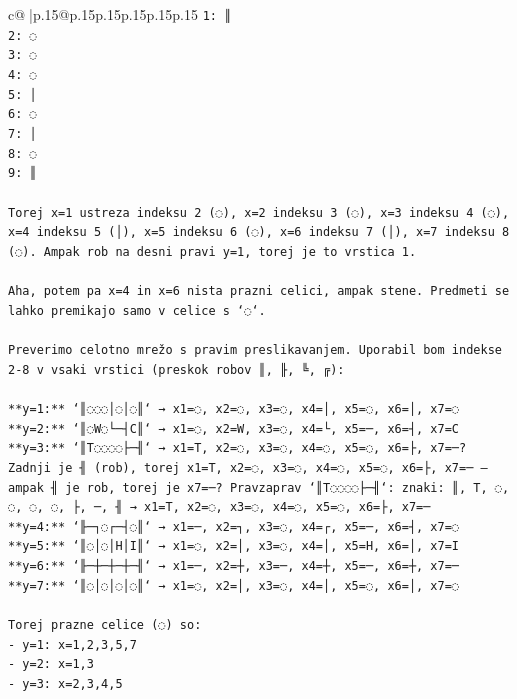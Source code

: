 \documentclass{article}
\begin{document}
{\begin{supertabular}{c@{$\;$}|p{.15\linewidth}@{}p{.15\linewidth}p{.15\linewidth}p{.15\linewidth}p{.15\linewidth}p{.15\linewidth}}
{{{\texttt{1: ║} \\
\texttt{2: ◌} \\
\texttt{3: ◌} \\
\texttt{4: ◌} \\
\texttt{5: │} \\
\texttt{6: ◌} \\
\texttt{7: │} \\
\texttt{8: ◌} \\
\texttt{9: ║} \\
\\ 
\texttt{Torej x=1 ustreza indeksu 2 (◌), x=2 indeksu 3 (◌), x=3 indeksu 4 (◌), x=4 indeksu 5 (│), x=5 indeksu 6 (◌), x=6 indeksu 7 (│), x=7 indeksu 8 (◌). Ampak rob na desni pravi y=1, torej je to vrstica 1.} \\
\\ 
\texttt{Aha, potem pa x=4 in x=6 nista prazni celici, ampak stene. Predmeti se lahko premikajo samo v celice s `◌`.} \\
\\ 
\texttt{Preverimo celotno mrežo s pravim preslikavanjem. Uporabil bom indekse 2{-}8 v vsaki vrstici (preskok robov ║, ╟, ╚, ╔):} \\
\\ 
\texttt{**y=1:** `║◌◌◌│◌│◌║` → x1=◌, x2=◌, x3=◌, x4=│, x5=◌, x6=│, x7=◌} \\
\texttt{**y=2:** `║◌W◌└─┤C║` → x1=◌, x2=W, x3=◌, x4=└, x5=─, x6=┤, x7=C} \\
\texttt{**y=3:** `║T◌◌◌◌├─╢` → x1=T, x2=◌, x3=◌, x4=◌, x5=◌, x6=├, x7=─? Zadnji je ╢ (rob), torej x1=T, x2=◌, x3=◌, x4=◌, x5=◌, x6=├, x7=─ — ampak ╢ je rob, torej je x7=─? Pravzaprav `║T◌◌◌◌├─╢`: znaki: ║, T, ◌, ◌, ◌, ◌, ├, ─, ╢ → x1=T, x2=◌, x3=◌, x4=◌, x5=◌, x6=├, x7=─} \\
\texttt{**y=4:** `╟─┐◌┌─┤◌║` → x1=─, x2=┐, x3=◌, x4=┌, x5=─, x6=┤, x7=◌} \\
\texttt{**y=5:** `║◌│◌│H│I║` → x1=◌, x2=│, x3=◌, x4=│, x5=H, x6=│, x7=I} \\
\texttt{**y=6:** `╟─┼─┼─┼─╢` → x1=─, x2=┼, x3=─, x4=┼, x5=─, x6=┼, x7=─} \\
\texttt{**y=7:** `║◌│◌│◌│◌║` → x1=◌, x2=│, x3=◌, x4=│, x5=◌, x6=│, x7=◌} \\
\\ 
\texttt{Torej prazne celice (◌) so:} \\
\texttt{{-} y=1: x=1,2,3,5,7} \\
\texttt{{-} y=2: x=1,3} \\
\texttt{{-} y=3: x=2,3,4,5} \\
}}}
\end{supertabular}}
\end{document}

